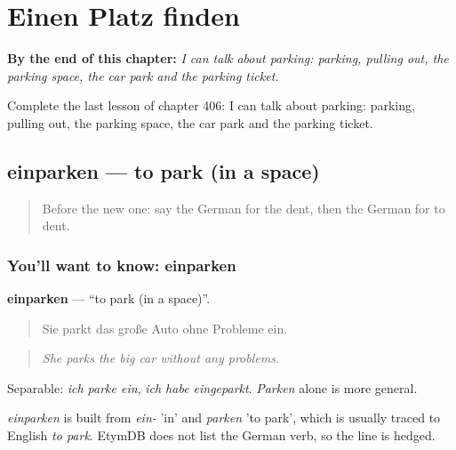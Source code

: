 
\chapter{Einen Platz finden}
\label{ch:ge-einen-platz-finden}

\begin{chapteropening}
\textbf{By the end of this chapter:} \emph{I can talk about parking: parking, pulling out, the parking space, the car park and the parking ticket.}

Complete the last lesson of chapter 406: I can talk about parking: parking, pulling out, the parking space, the car park and the parking ticket.
\end{chapteropening}

\section[einparken]{einparken — to park (in a space)}

\label{lesson:GE-C406-einparken}



\begin{quote}
Before the new one: say the German for the dent, then the German for to dent.
\end{quote}

\subsection*{You'll want to know: einparken}
\textbf{einparken} — \textquotedblleft{}to park (in a space)\textquotedblright{}.

\begin{quote}
Sie parkt das große Auto ohne Probleme ein.
\end{quote}

\begin{quote}
\emph{She parks the big car without any problems.}
\end{quote}

Separable: \emph{ich parke ein}, \emph{ich habe eingeparkt}. \emph{Parken} alone is more general.

\begin{cousinweb}
\emph{einparken} is built from \emph{ein-} 'in' and \emph{parken} 'to park', which is usually traced to English \emph{to park}. EtymDB does not list the German verb, so the line is hedged.
\end{cousinweb}

